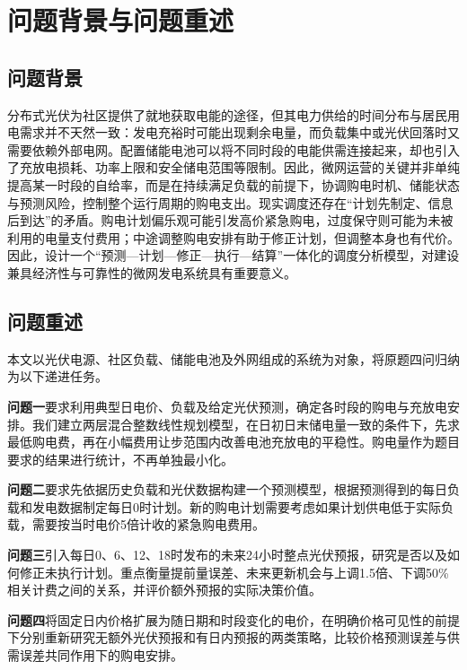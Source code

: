 \section{问题背景与问题重述}
\subsection{问题背景}
分布式光伏为社区提供了就地获取电能的途径，但其电力供给的时间分布与居民用电需求并不天然一致：发电充裕时可能出现剩余电量，而负载集中或光伏回落时又需要依赖外部电网。配置储能电池可以将不同时段的电能供需连接起来，却也引入了充放电损耗、功率上限和安全储电范围等限制。因此，微网运营的关键并非单纯提高某一时段的自给率，而是在持续满足负载的前提下，协调购电时机、储能状态与预测风险，控制整个运行周期的购电支出。现实调度还存在“计划先制定、信息后到达”的矛盾。购电计划偏乐观可能引发高价紧急购电，过度保守则可能为未被利用的电量支付费用；中途调整购电安排有助于修正计划，但调整本身也有代价。因此，设计一个“预测—计划—修正—执行—结算”一体化的调度分析模型，对建设兼具经济性与可靠性的微网发电系统具有重要意义。


\subsection{问题重述}
本文以光伏电源、社区负载、储能电池及外网组成的系统为对象，将原题四问归纳为以下递进任务。

\textbf{问题一}要求利用典型日电价、负载及给定光伏预测，确定各时段的购电与充放电安排。我们建立两层混合整数线性规划模型，在日初日末储电量一致的条件下，先求最低购电费，再在小幅费用让步范围内改善电池充放电的平稳性。购电量作为题目要求的结果进行统计，不再单独最小化。

\textbf{问题二}要求先依据历史负载和光伏数据构建一个预测模型，根据预测得到的每日负载和发电数据制定每日0时计划。新的购电计划需要考虑如果计划供电低于实际负载，需要按当时电价5倍计收的紧急购电费用。

\textbf{问题三}引入每日0、6、12、18时发布的未来24小时整点光伏预报，研究是否以及如何修正未执行计划。重点衡量提前量误差、未来更新机会与上调1.5倍、下调50\%相关计费之间的关系，并评价额外预报的实际决策价值。

\textbf{问题四}将固定日内价格扩展为随日期和时段变化的电价，在明确价格可见性的前提下分别重新研究无额外光伏预报和有日内预报的两类策略，比较价格预测误差与供需误差共同作用下的购电安排。

